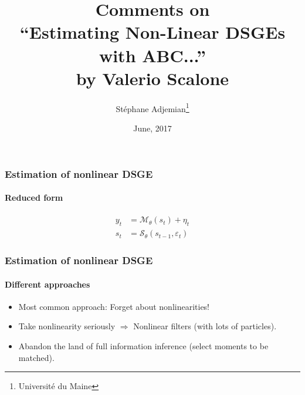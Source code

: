\documentclass[10pt]{beamer}
\begin{document}
\title{Comments on\\``Estimating Non-Linear DSGEs with ABC...''\\ by Valerio Scalone}
\author{Stéphane Adjemian\footnote{Université du Maine}}
\date{June, 2017}


\begin{frame}
  \maketitle
\end{frame}


\begin{frame}[c]
\frametitle{Estimation of nonlinear DSGE}
\framesubtitle{Reduced form}

  
\[
  \begin{split}
    y_t &= \mathcal M_\theta(s_t) + \eta_t\\
    s_t &= \mathcal S_\theta(s_{t-1}, \varepsilon_t)
  \end{split}
\]

\end{frame}


\begin{frame}
\frametitle{Estimation of nonlinear DSGE}
\framesubtitle{Different approaches}

\bigskip
\bigskip
  
\begin{itemize}
\item Most common approach: Forget about nonlinearities!\newline
  \bigskip
\item Take nonlinearity seriously $\Rightarrow$ Nonlinear filters (with lots of particles).\newline
  \bigskip
\item Abandon the land of full information inference (select moments to be matched).
\end{itemize}

\end{frame}
\end{document}
